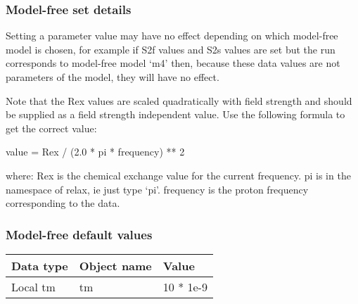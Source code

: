 \subsubsection{Model-free set details}

Setting a parameter value may have no effect depending on which model-free model is chosen,
for example if S2f values and S2s values are set but the run corresponds to model-free model
`m4' then, because these data values are not parameters of the model, they will have no
effect.

Note that the Rex values are scaled quadratically with field strength and should be supplied
as a field strength independent value.  Use the following formula to get the correct value:

    value = Rex / (2.0 * pi * frequency) ** 2

where:
    Rex is the chemical exchange value for the current frequency.
    pi is in the namespace of relax, ie just type `pi'.
    frequency is the proton frequency corresponding to the data.


\subsubsection{Model-free default values}



\begin{center}
\begin{tabular}{lll}
\toprule
Data type & Object name & Value \\
\midrule
 Local tm                               &  tm            &  10 * 1e-9                     \\
\bottomrule
\end{tabular}
\end{center}

